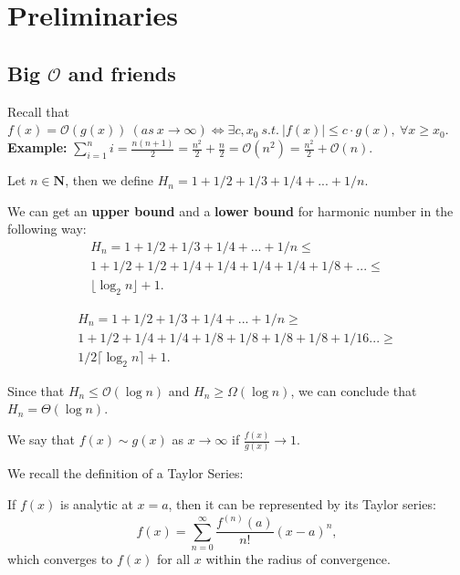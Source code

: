 \section{Preliminaries}

\subsection{Big $\mathcal{O}$ and friends}

Recall that $f(x) = \mathcal{O}(g(x)) ~(as~x\rightarrow\infty) \iff \exists c,x_0~s.t.~ |f(x)| \leq c\cdot g(x), ~\forall x \geq x_0.$ \textbf{Example:} $\sum_{i=1}^{n} i = \frac{n(n+1)}{2} = \frac{n^2}{2} + \frac{n}{2} = \mathcal{O}(n^2) = \frac{n^2}{2} + \mathcal{O}(n) $.


\begin{definition}
    Let $n \in \mathbf{N}$, then we define $H_n=1+1/2 +1/3+1/4 + ...+1/n.$
\end{definition}

We can get an \textbf{upper bound} and a \textbf{lower bound} for harmonic number in the following way:
\begin{align*}
    H_n=1+1/2 +1/3+1/4 + ...+1/n \leq \\    
    1 + 1/2 + 1/2 + 1/4 + 1/4 + 1/4 + 1/4 + 1/8 + ... \leq\\
    \lfloor \log_2 n \rfloor + 1.
\end{align*}

\begin{align*}
    H_n=1+1/2 +1/3+1/4 + ...+1/n \geq \\    
    1 + 1/2 + 1/4 + 1/4 + 1/8 + 1/8 + 1/8 + 1/8 + 1/16 ... \geq\\
    1/2 \lceil \log_2 n \rceil + 1.
\end{align*}

Since that $H_n \leq \mathcal{O}(\log n)$ and $H_n \geq \Omega(\log n)$, we can conclude that $H_n = \Theta(\log n).$

\begin{definition}[$f(x) \sim g(x)$]
    We say that $f(x) \sim g(x)$ as $x \rightarrow \infty$ if $\frac{f(x)}{g(x)} \rightarrow 1$.
\end{definition}

We recall the definition of a Taylor Series:

\begin{theorem}
If $f(x)$ is analytic at $x=a$, then it can be represented by its Taylor series:
\[
f(x)=\sum_{n=0}^{\infty}\frac{f^{(n)}(a)}{n!}(x-a)^n,
\]
which converges to $f(x)$ for all $x$ within the radius of convergence.
\end{theorem}

